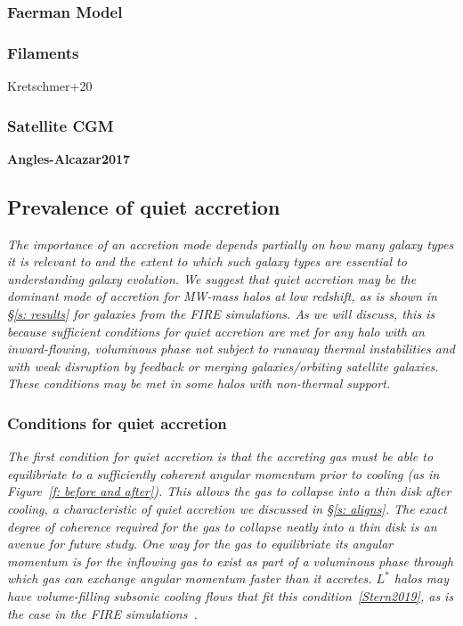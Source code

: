 \documentclass[fleqn,usenatbib]{mnras}
\begin{document}
\subsubsection{Faerman Model}

\subsubsection{Filaments}
Kretschmer+20

\subsubsection{Satellite CGM}

\textbf{Angles-Alcazar2017}

\subsection{Prevalence of quiet accretion}
\label{s: prevalence}

\textit{
The importance of  an accretion mode depends partially on how many galaxy types it is relevant to and the extent to which such galaxy types are essential to understanding galaxy evolution.
We suggest that quiet accretion may be the dominant mode of accretion for MW-mass halos at low redshift, as is shown in \S\ref{s: results} for galaxies from the FIRE simulations.
As we will discuss, this is because sufficient conditions for quiet accretion are met for any halo with an inward-flowing, voluminous phase not subject to runaway thermal instabilities and with weak disruption by feedback or merging galaxies/orbiting satellite galaxies.
These conditions may be met in some halos with non-thermal support.
}

\subsubsection{Conditions for quiet accretion}

\textit{
The first condition for quiet accretion is that the accreting gas must be able to equilibriate to a sufficiently coherent angular momentum prior to cooling (as in Figure~\ref{f: before and after}).
This allows the gas to collapse into a thin disk after cooling, a characteristic of quiet accretion we discussed in \S\ref{s: aligns}.
The exact degree of coherence required for the gas to collapse neatly into a thin disk is an avenue for future study.
One way for the gas to equilibriate its angular momentum is for the inflowing gas to exist as part of a voluminous phase through which gas can exchange angular momentum faster than it accretes.
$L^*$ halos may have volume-filling subsonic cooling flows that fit this condition~\ref{Stern2019}, as is the case in the FIRE simulations~\citep{Stern2020}.
}
\end{document}
